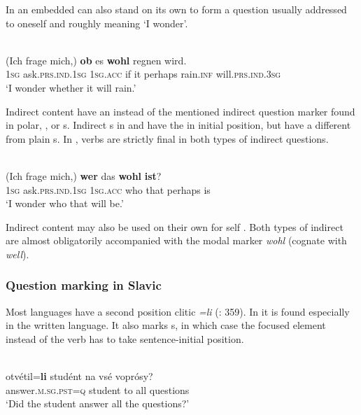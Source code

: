 In  an embedded  can also stand on its own to form a question usually addressed to oneself and roughly meaning ‘I wonder’.

\ea%
    \label{ex:indo:14}
    \\
    \gll (Ich  frage      mich,) \textbf{{ob}} es \textbf{wohl} regnen    wird.\\
    1\textsc{sg}  ask.\textsc{prs}.\textsc{ind}.1\textsc{sg}  1\textsc{sg.acc}  if  it  perhaps rain.\textsc{inf}  will.\textsc{prs}.\textsc{ind}.3\textsc{sg}\\
    \glt ‘I wonder whether it will rain.’
    \z

Indirect content  have an  instead of the mentioned indirect question marker found in polar, , or s. Indirect s in  and  have the  in initial position, but have a different  from plain s. In , verbs are strictly final in both types of indirect questions.

\ea%
    \label{ex:indo:15}
    \\
    \gll (Ich  frage      mich,) \textbf{{wer}} das \textbf{{wohl}} \textbf{{ist}}?\\
    1\textsc{sg}  ask.\textsc{prs}.\textsc{ind}.1\textsc{sg}  1\textsc{sg.acc}  who  that  perhaps  is\\
    \glt ‘I wonder who that will be.’
    \z

Indirect content  may also be used on their own for self . Both types of indirect  are almost obligatorily accompanied with the modal marker \textit{wohl} (cognate with  \textit{well}).

\subsubsection{Question marking in Slavic}\label{sec:5.5.2.3}

Most  languages have a second position  clitic \textit{=li} (\citealt{SussexCubberley2006}: 359). In  it is found especially in the written language. It also marks s, in which case the focused element instead of the verb has to take sentence-initial position.

\ea%
    \label{ex:indo:16}
    \\
    \ea
    \gll otvétil=\textbf{{li}} studént    na  vsé  voprósy?\\
    answer.\textsc{m}.\textsc{sg}.\textsc{pst}=\textsc{q}  student    to  all  questions\\
    \glt ‘Did the student answer all the questions?’

